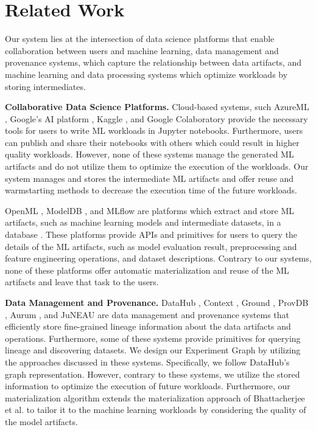 \section{Related Work} \label{sec-related-work}
Our system lies at the intersection of data science platforms that enable collaboration between users and machine learning, data management and provenance systems, which capture the relationship between data artifacts, and machine learning and data processing systems which optimize workloads by storing intermediates.

\textbf{Collaborative Data Science Platforms.}
Cloud-based systems, such AzureML \cite{team2016azureml}, Google's AI platform \cite{googleai}, Kaggle \cite{kagglewebsite}, and Google Colaboratory \cite{googlecolab} provide the necessary tools for users to write ML workloads in Jupyter notebooks.
Furthermore, users can publish and share their notebooks with others which could result in higher quality workloads.
However, none of these systems manage the generated ML artifacts and do not utilize them to optimize the execution of the workloads.
Our system manages and stores the intermediate ML artifacts and offer reuse and warmstarting methods to decrease the execution time of the future workloads.

OpenML \cite{vanschoren2014openml}, ModelDB \cite{vartak2016m}, and MLflow \cite{zaharia2018accelerating} are platforms which extract and store ML artifacts, such as machine learning models and intermediate datasets, in a database \cite{schelter2017automatically, Vanschoren2012}.
These platforms provide APIs and primitives for users to query the details of the ML artifacts, such as model evaluation result, preprocessing and feature engineering operations, and dataset descriptions.
Contrary to our systems, none of these platforms offer automatic materialization and reuse of the ML artifacts and leave that task to the users.

\textbf{Data Management and Provenance.}
DataHub \cite{bhardwaj2014datahub, bhattacherjee2015principles}, Context \cite{garcia2018context}, Ground \cite{hellerstein2017ground}, ProvDB \cite{miao2018provdb}, Aurum \cite{fernandez2018aurum}, and JuNEAU \cite{ives2019dataset} are data management and provenance systems that efficiently store fine-grained lineage information about the data artifacts and operations.
Furthermore, some of these systems provide primitives for querying lineage and discovering datasets.
We design our Experiment Graph by utilizing the approaches discussed in these systems.
Specifically, we follow DataHub's graph representation.
However, contrary to these systems, we utilize the stored information to optimize the execution of future workloads.
Furthermore, our materialization algorithm extends the materialization approach of Bhattacherjee et al. \cite{bhattacherjee2015principles} to tailor it to the machine learning workloads by considering the quality of the model artifacts.

